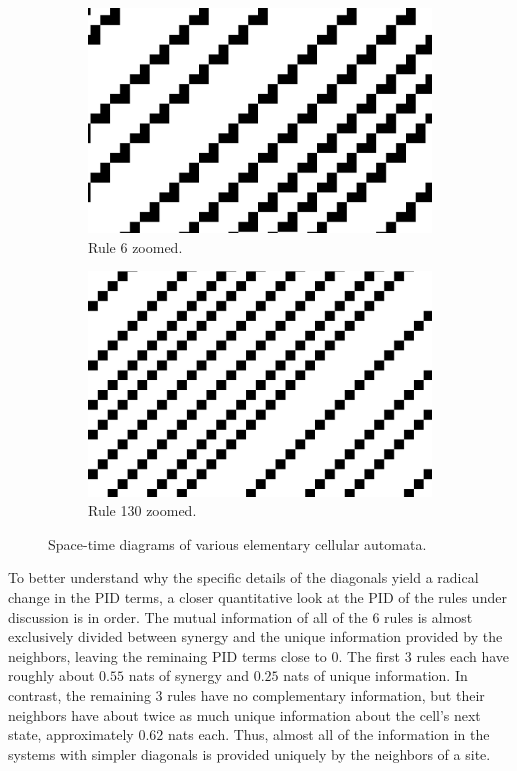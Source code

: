 \documentclass[12pt]{article}
\begin{document}
\begin{figure} [!h]
\begin{subfigure}{.5\textwidth}
  \centering
  \includegraphics[width=.9\linewidth]{rule6-zoomed}
  \caption{Rule 6 zoomed.}
  \label{fig:rule6-zoomed}
\end{subfigure}%
\begin{subfigure}{.5\textwidth}
  \centering
  \includegraphics[width=.9\linewidth]{rule130-zoomed}
  \caption{Rule 130 zoomed.}
  \label{fig:rule130-zoomed}
\end{subfigure}
\caption{Space-time diagrams of various elementary cellular automata.}
\label{fig:eca-diagonals-zoomed}
\end{figure}

To better understand why the specific details of the diagonals yield a radical change in the PID terms, a closer quantitative look at the PID of the rules under discussion is in order. The mutual information of all of the 6 rules is almost exclusively divided between synergy and the unique information provided by the neighbors, leaving the reminaing PID terms close to 0. The first 3 rules each have roughly about $0.55$ nats of synergy and $0.25$ nats of unique information. In contrast, the remaining 3 rules have no complementary information, but their neighbors have about twice as much unique information about the cell's next state, approximately $0.62$ nats each. Thus, almost all of the information in the systems with simpler diagonals is provided uniquely by the neighbors of a site. 
\end{document}
